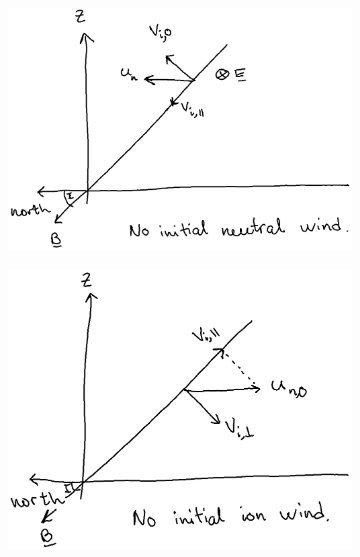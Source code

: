 \begin{figure}[t]
    \begin{subfigure}[t]{.32\linewidth}
        \centering
        \includegraphics[width=\linewidth]{bilder/L6_no_init_neut_wind.png}
        \caption{}\label{fig:L6_no_init_neut_wind}
    \end{subfigure}
    \begin{subfigure}[t]{.32\linewidth}
        \centering
        \includegraphics[width=\linewidth]{bilder/L6_no_init_ion_wind.png}
        \caption{}\label{fig:L6_no_init_ion_wind}
    \end{subfigure}
    \begin{subfigure}[t]{.32\linewidth}
        \centering

\end{subfigure}
\end{figure}
